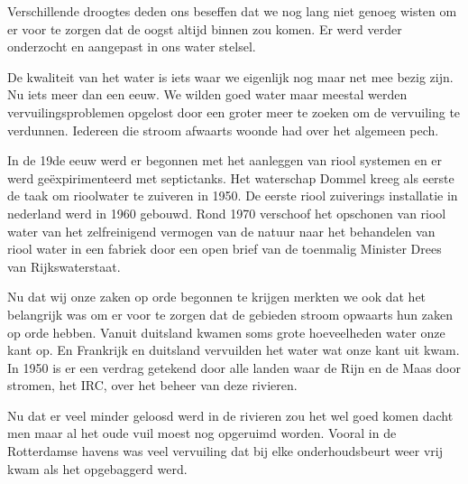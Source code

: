 Verschillende droogtes deden ons beseffen dat we nog lang niet genoeg wisten om er voor te zorgen dat de oogst altijd binnen zou komen.
Er werd verder onderzocht en aangepast in ons water stelsel.

De kwaliteit van het water is iets waar we eigenlijk nog maar net mee bezig zijn.
Nu iets meer dan een eeuw.
We wilden goed water maar meestal werden vervuilingsproblemen opgelost door een groter meer te zoeken om de vervuiling te verdunnen.
Iedereen die stroom afwaarts woonde had over het algemeen pech.

In de 19de eeuw werd er begonnen met het aanleggen van riool systemen en er werd ge\"expirimenteerd met septictanks.
Het waterschap Dommel kreeg als eerste de taak om rioolwater te zuiveren in 1950.
De eerste riool zuiverings installatie in nederland werd in 1960 gebouwd.
Rond 1970 verschoof het opschonen van riool water van het zelfreinigend vermogen van de natuur naar het behandelen van riool water in een fabriek door een open brief van de toenmalig Minister Drees van Rijkswaterstaat.

Nu dat wij onze zaken op orde begonnen te krijgen merkten we ook dat het belangrijk was om er voor te zorgen dat de gebieden stroom opwaarts hun zaken op orde hebben.
Vanuit duitsland kwamen soms grote hoeveelheden water onze kant op.
En Frankrijk en duitsland vervuilden het water wat onze kant uit kwam.
In 1950 is er een verdrag getekend door alle landen waar de Rijn en de Maas door stromen, het IRC, over het beheer van deze rivieren.

Nu dat er veel minder geloosd werd in de rivieren zou het wel goed komen dacht men maar al het oude vuil moest nog opgeruimd worden. 
Vooral in de Rotterdamse havens was veel vervuiling dat bij elke onderhoudsbeurt weer vrij kwam als het opgebaggerd werd.


